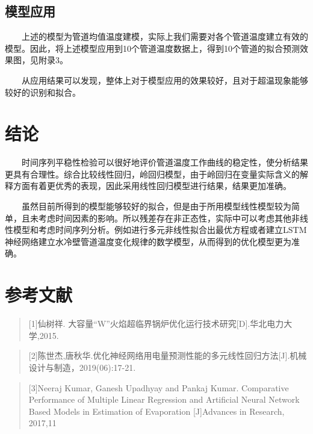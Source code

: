 \documentclass[
]{article}
\begin{document}
\hypertarget{ux6a21ux578bux5e94ux7528}{%
\subsection{模型应用}\label{ux6a21ux578bux5e94ux7528}}

  上述的模型为管道均值温度建模，实际上我们需要对各个管道温度建立有效的模型。因此，将上述模型应用到10个管道温度数据上，得到10个管道的拟合预测效果图，见附录3。

  从应用结果可以发现，整体上对于模型应用的效果较好，且对于超温现象能够较好的识别和拟合。

\hypertarget{ux7ed3ux8bba}{%
\section{结论}\label{ux7ed3ux8bba}}

  时间序列平稳性检验可以很好地评价管道温度工作曲线的稳定性，使分析结果更具有合理性。综合比较线性回归，岭回归模型，由于岭回归在变量实际含义的解释方面有着更优秀的表现，因此采用线性回归模型进行结果，结果更加准确。

  虽然目前所得到的模型能够较好的拟合，但是由于所用模型线性模型较为简单，且未考虑时间因素的影响。所以残差存在非正态性，实际中可以考虑其他非线性模型和考虑时间序列分析。例如进行多元非线性拟合出最优方程或者建立LSTM神经网络建立水冷壁管道温度变化规律的数学模型，从而得到的优化模型更为准确。

\newpage

\hypertarget{ux53c2ux8003ux6587ux732e}{%
\section{参考文献}\label{ux53c2ux8003ux6587ux732e}}

\begin{quote}
{[}1{]}仙树祥.
大容量``W''火焰超临界锅炉优化运行技术研究{[}D{]}.华北电力大学,2015.
\end{quote}

\begin{quote}
{[}2{]}陈世杰,唐秋华.优化神经网络用电量预测性能的多元线性回归方法{[}J{]}.机械设计与制造，2019(06):17-21.
\end{quote}

\begin{quote}
{[}3{]}Neeraj Kumar, Ganesh Upadhyay and Pankaj Kumar. Comparative
Performance of Multiple Linear Regression and Artificial Neural Network
Based Models in Estimation of Evaporation {[}J{]}Advances in Research,
2017,11
\end{quote}
\end{document}
